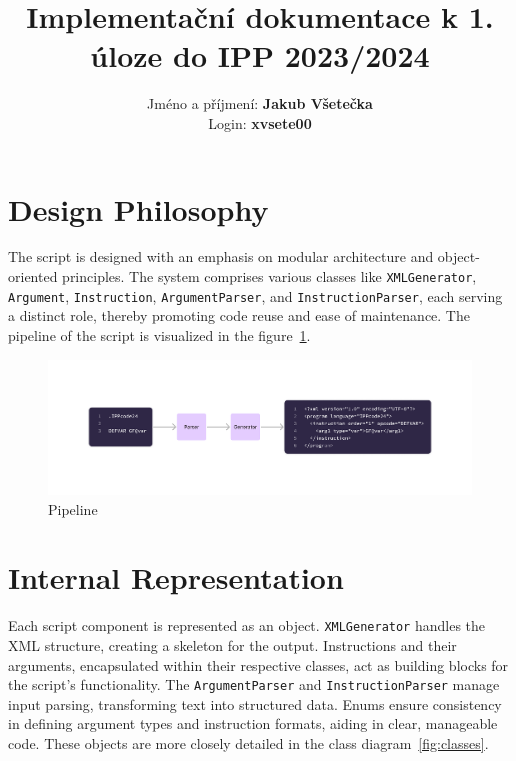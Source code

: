 \documentclass[10pt,a4paper]{article}
\title{Implementační dokumentace k \textbf{1}. úloze do IPP 2023/2024}
\author{Jméno a příjmení: \textbf{Jakub Všetečka} \\ Login: \textbf{xvsete00}}
\date{}
\newcommand{\code}[1]{\texttt{#1}}
\begin{document}
\maketitle

\section{Design Philosophy}
The script is designed with an emphasis on modular architecture and object-oriented principles. The system comprises various classes like \code{XMLGenerator}, \code{Argument}, \code{Instruction}, \code{ArgumentParser}, and \code{InstructionParser}, each serving a distinct role, thereby promoting code reuse and ease of maintenance. The pipeline of the script is visualized in the figure~\ref{fig:pipeline}.

\begin{figure}[h]
\centering
\includegraphics[width=\textwidth]{imgs/design.png}
\caption{Pipeline}
\label{fig:pipeline}
\end{figure}

\section{Internal Representation}
Each script component is represented as an object. \code{XMLGenerator} handles the XML structure, creating a skeleton for the output. Instructions and their arguments, encapsulated within their respective classes, act as building blocks for the script's functionality. The \code{ArgumentParser} and \code{InstructionParser} manage input parsing, transforming text into structured data. Enums ensure consistency in defining argument types and instruction formats, aiding in clear, manageable code. These objects are more closely detailed in the class
diagram~\ref{fig:classes}.
\end{document}
